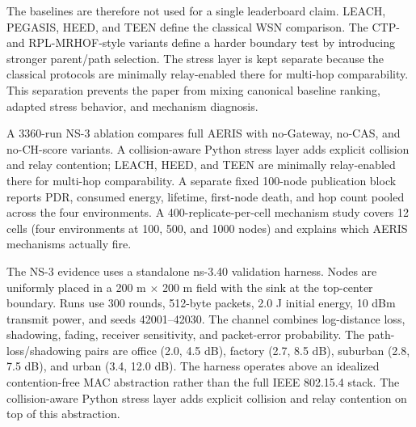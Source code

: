 \documentclass[conference]{IEEEtran}
\begin{document}
The baselines are therefore not used for a single leaderboard claim. LEACH, PEGASIS, HEED, and TEEN define the classical WSN comparison. The CTP- and RPL-MRHOF-style variants define a harder boundary test by introducing stronger parent/path selection. The stress layer is kept separate because the classical protocols are minimally relay-enabled there for multi-hop comparability. This separation prevents the paper from mixing canonical baseline ranking, adapted stress behavior, and mechanism diagnosis.

A 3360-run NS-3 ablation compares full AERIS with no-Gateway, no-CAS, and no-CH-score variants. A collision-aware Python stress layer adds explicit collision and relay contention; LEACH, HEED, and TEEN are minimally relay-enabled there for multi-hop comparability. A separate fixed 100-node publication block reports PDR, consumed energy, lifetime, first-node death, and hop count pooled across the four environments. A 400-replicate-per-cell mechanism study covers 12 cells (four environments at 100, 500, and 1000 nodes) and explains which AERIS mechanisms actually fire.

The NS-3 evidence uses a standalone ns-3.40 validation harness. Nodes are uniformly placed in a 200 m $\times$ 200 m field with the sink at the top-center boundary. Runs use 300 rounds, 512-byte packets, 2.0 J initial energy, 10 dBm transmit power, and seeds 42001--42030. The channel combines log-distance loss, shadowing, fading, receiver sensitivity, and packet-error probability. The path-loss/shadowing pairs are office (2.0, 4.5 dB), factory (2.7, 8.5 dB), suburban (2.8, 7.5 dB), and urban (3.4, 12.0 dB). The harness operates above an idealized contention-free MAC abstraction rather than the full IEEE 802.15.4 stack. The collision-aware Python stress layer adds explicit collision and relay contention on top of this abstraction.
\end{document}
